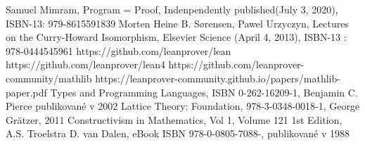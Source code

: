 \documentclass[a4paper,10pt,oneside]{report}%
\begin{document}
\begin{thebibliography}{xx}
     Samuel Mimram, Program = Proof, Indenpendently published(July 3, 2020), ISBN-13: 979-8615591839
     Morten Heine B. Sørensen, Pawel Urzyczyn, Lectures on the Curry-Howard Isomorphism,
        Elsevier Science (April 4, 2013),  ISBN-13 : 978-0444545961
     https://github.com/leanprover/lean
     https://github.com/leanprover/lean4
     https://github.com/leanprover-community/mathlib
     https://leanprover-community.github.io/papers/mathlib-paper.pdf
     Types and Programming Languages, ISBN 0-262-16209-1, Benjamin C. Pierce publikované v 2002
     Lattice Theory: Foundation, 978-3-0348-0018-1, George Grätzer, 2011
     Constructivism in Mathematics, Vol 1, Volume 121 1st Edition, A.S. Troelstra D. van Dalen, eBook ISBN 978-0-0805-7088-, publikované v 1988

\end{thebibliography}
\end{document}
